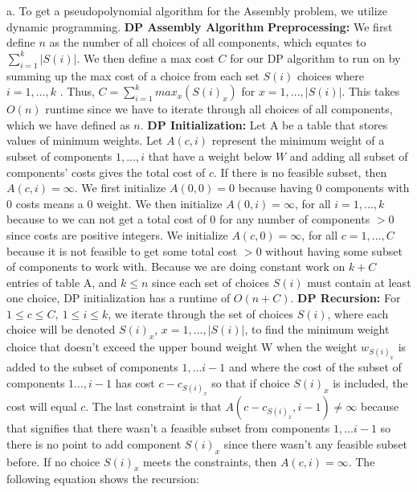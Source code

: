 \documentclass[oneside]{homework} %
\begin{document}
{\large a.} To get a pseudopolynomial algorithm for the Assembly problem, we utilize dynamic programming.
\newline
\newline
\textbf{DP Assembly Algorithm}
\newline
\newline
\textbf{Preprocessing:} We first define $n$ as the number of all choices of all components, which equates to $\sum\limits_{i=1}^{k}|S(i)|$. We then define a max cost $C$ for our DP algorithm to run on by summing up the max cost of a choice from each set $S(i)$ choices where $i = 1,...,k$ . Thus, $C = \sum\limits_{i=1}^{k}max_x(S(i)_x)$ for $x = 1,...,|S(i)|$. This takes $O(n)$ runtime since we have to iterate through all choices of all components, which we have defined as $n$.
\newline
\newline
\textbf{DP Initialization:} Let A be a table that stores values of minimum weights. Let $A(c, i)$ represent the minimum weight of a subset of components $1,...,i$ that have a weight below $W$ and adding all subset of components' costs gives the total cost of $c$. If there is no feasible subset, then $A(c,i) = \infty$. We first initialize $A(0,0) = 0$ because having 0 components with 0 costs means a 0 weight. We then initialize $A(0,i) = \infty$, for all $i = 1,...,k$ because to we can not get a total cost of 0 for any number of components $> 0$ since costs are positive integers. We initialize $A(c,0) = \infty$, for all $c = 1,...,C$ because it is not feasible to get some total cost $> 0$ without having some subset of components to work with. Because we are doing constant work on $k + C$ entries of table A, and $k \leq n$ since each set of choices $S(i)$ must contain at least one choice, DP initialization has a runtime of $O(n + C)$.
\newline
\newline
\textbf{DP Recursion:} 
\newline
For $1 \leq c \leq C, \ 1 \leq i \leq k$, we iterate through the set of choices $S(i)$, where each choice will be denoted $S(i)_x$, $x = 1,...,|S(i)|$, to find the minimum weight choice that doesn't exceed the upper bound weight W when the weight $w_{S(i)_x}$ is added to the subset of components $1,...i-1$ and where the cost of the subset of components $1...,i-1$ has cost $c - c_{S(i)_x}$ so that if choice $S(i)_x$ is included, the cost will equal $c$. The last constraint is that $A(c-c_{S(i)_x}, i-1) \neq \infty$ because that signifies that there wasn't a feasible subset from components $1,...i-1$ so there is no point to add component $S(i)_x$ since there wasn't any feasible subset before. If no choice $S(i)_x$ meets the constraints, then $A(c,i) = \infty$. The following equation shows the recursion:
\end{document}
